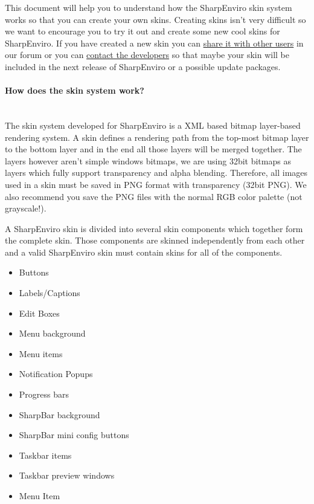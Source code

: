 This document will help you to understand how the SharpEnviro skin system works so that you can create your own skins. Creating skins isn't very difficult so we want to encourage you to try it out and create some new cool skins for SharpEnviro. If you have created a new skin you can \href{http://www.sharpenviro.com/wp/?page_id=38/customization/}{share it with other users} in our forum or you can \href{http://www.sharpenviro.com/wp/?page_id=23}{contact the developers} so that maybe your skin will be included in the next release of SharpEnviro or a possible update packages.

\paragraph{How does the skin system work?}\hspace{0cm}\\
The skin system developed for SharpEnviro is a XML based bitmap layer-based rendering system. A skin defines a rendering path from the top-most bitmap layer to the bottom layer and in the end all those layers will be merged together. The layers however aren't simple windows bitmaps, we are using 32bit bitmaps as layers which fully support transparency and alpha blending. Therefore, all images used in a skin must be saved in PNG format with transparency (32bit PNG). We also recommend you save the PNG files with the normal RGB color palette (not grayscale!). 

A SharpEnviro skin is divided into several skin components which together form the complete skin. Those components are skinned independently from each other and a valid SharpEnviro skin must contain skins for all of the components. 
\begin{itemize}
  \item Buttons
  \item Labels/Captions
  \item Edit Boxes
  \item Menu background
  \item Menu items
  \item Notification Popups
  \item Progress bars
  \item SharpBar background
  \item SharpBar mini config buttons
  \item Taskbar items
  \item Taskbar preview windows
  \item Menu Item
\end{itemize}

